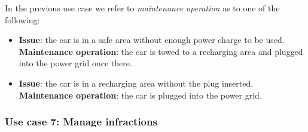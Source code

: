		In the previous use case we refer to \textit{maintenance operation} as to one of the following:
	\begin{itemize}
		\item \textbf{Issue}: the car is in a safe area without enough power charge to be used. \textbf{Maintenance operation}: the car is towed to a recharging area and plugged into the power grid once there.
		\item \textbf{Issue}: the car is in a recharging area without the plug inserted. \textbf{Maintenance operation}: the car is plugged into the power grid.
	\end{itemize}
	
	
	\subsubsection{Use case 7: Manage infractions}
